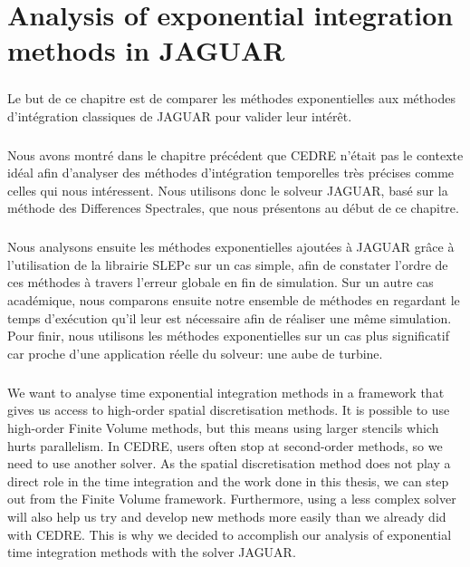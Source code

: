 \chapter{Analysis of exponential integration methods in JAGUAR}

\begin{tcolorbox}[title=Résumé du chapitre : Analyse des méthodes d'intégration exponentielles dans JAGUAR, colframe=black!50!white]
  \paragraph{}
  Le but de ce chapitre est de comparer les méthodes exponentielles aux méthodes d'intégration classiques de JAGUAR pour valider leur intérêt.

  \paragraph{}
  Nous avons montré dans le chapitre précédent que CEDRE n'était pas le contexte idéal afin d'analyser des méthodes d'intégration temporelles très précises comme celles qui nous intéressent.
  Nous utilisons donc le solveur JAGUAR, basé sur la méthode des Differences Spectrales, que nous présentons au début de ce chapitre.

  \paragraph{}
  Nous analysons ensuite les méthodes exponentielles ajoutées à JAGUAR grâce à l'utilisation de la librairie SLEPc sur un cas simple, afin de constater l'ordre de ces méthodes à travers l'erreur globale en fin de simulation.
  Sur un autre cas académique, nous comparons ensuite notre ensemble de méthodes en regardant le temps d'exécution qu'il leur est nécessaire afin de réaliser une même simulation.
  Pour finir, nous utilisons les méthodes exponentielles sur un cas plus significatif car proche d'une application réelle du solveur: une aube de turbine.
\end{tcolorbox}

  \vspace{1cm}
  \paragraph{}
  We want to analyse time exponential integration methods in a framework that gives us access to high-order spatial discretisation methods.
  It is possible to use high-order Finite Volume methods, but this means using larger stencils which hurts parallelism.
  In CEDRE, users often stop at second-order methods, so we need to use another solver.
  As the spatial discretisation method does not play a direct role in the time integration and the work done in this thesis, we can step out from the Finite Volume framework.
  Furthermore, using a less complex solver will also help us try and develop new methods more easily than we already did with CEDRE.
  This is why we decided to accomplish our analysis of exponential time integration methods with the solver JAGUAR.


